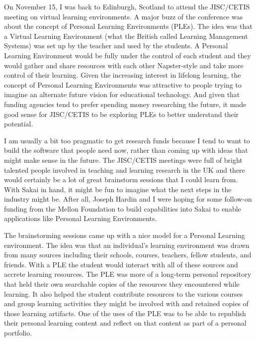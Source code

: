 \documentclass[12pt]{book}
\begin{document}

On November 15, I was back to Edinburgh, Scotland to attend
the JISC\slash CETIS meeting on virtual learning environments.  A major
buzz of the conference was about the concept of Personal
Learning Environments (PLEs).  The idea was that a
Virtual Learning Environment (what the British called
Learning Management Systems) was set up by the teacher and used
by the students.   A Personal Learning Environment
would be fully under the control of each student and they
would gather and share resources with each other Napster-style
and take more control of their learning.
Given the increasing interest in lifelong learning, the concept of
Personal Learning Environments was attractive to people
trying to imagine an alternate future vision
for educational technology.  And given that
funding agencies tend to prefer spending money researching the
future, it made good sense for JISC\slash CETIS to be exploring PLEs
to better understand their potential.

I am usually a bit too pragmatic to get research funds because I
tend to want to build the software that people need now, rather
than coming up with ideas that might make sense in the future.
The JISC\slash CETIS meetings were full of bright talented people involved in
teaching and learning research in the UK and
there would certainly be a lot of great brainstorm sessions that I
could learn from.  With Sakai in hand, it might be fun to imagine
what the next steps in the industry might be.  After all, Joseph
Hardin and I were hoping for some follow-on funding from the
Mellon Foundation to build capabilities into Sakai to enable applications
like Personal Learning Environments.

The brainstorming sessions came up with a nice model for a Personal
Learning environment.  The idea was that an individual's learning
environment was drawn from many sources including their
schools, courses, teachers, fellow students, and friends.
With a PLE the student would interact with all of these sources
and accrete learning resources.  The PLE was more of a
long-term personal repository that held their own searchable copies
of the resources they encountered while learning.  It also helped
the student contribute resources to the various courses and group
learning activities they might be involved with and retained copies
of those learning artifacts.   One of the uses of the PLE was to be
able to republish their personal learning content and reflect on
that content as part of a personal portfolio.
\end{document}
